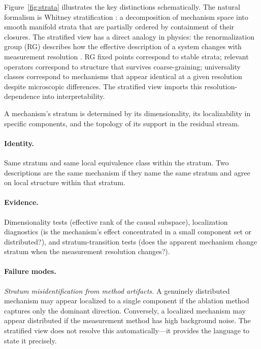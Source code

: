 \documentclass{article}
\begin{document}
Figure~\ref{fig:strata} illustrates the key distinctions schematically.
The natural formalism is Whitney stratification \citep{whitney1965,golubitsky1973}:
a decomposition of mechanism space into smooth manifold strata that are
partially ordered by containment of their closures.  The stratified view
has a direct analogy in physics: the renormalization group (RG) describes
how the effective description of a system changes with measurement
resolution \citep{wilson1971,goldenfeld1992}.  RG fixed points correspond
to stable strata; relevant operators correspond to structure that survives
coarse-graining; universality classes correspond to mechanisms that appear
identical at a given resolution despite microscopic differences.  The
stratified view imports this resolution-dependence into interpretability.

A mechanism's stratum is determined
by its dimensionality, its localizability in specific components, and
the topology of its support in the residual stream.

\paragraph{Identity.}
Same stratum and same local equivalence class within the stratum.  Two
descriptions are the same mechanism if they name the same stratum and
agree on local structure within that stratum.

\paragraph{Evidence.}
Dimensionality tests (effective rank of the causal subspace),
localization diagnostics (is the mechanism's effect concentrated in a
small component set or distributed?), and stratum-transition tests
(does the apparent mechanism change stratum when the measurement
resolution changes?).

\paragraph{Failure modes.}
\emph{Stratum misidentification from method artifacts.}  A genuinely
distributed mechanism may appear localized to a single component if
the ablation method captures only the dominant direction.  Conversely,
a localized mechanism may appear distributed if the measurement method
has high background noise.  The stratified view does not resolve this
automatically---it provides the language to state it precisely.
\end{document}
